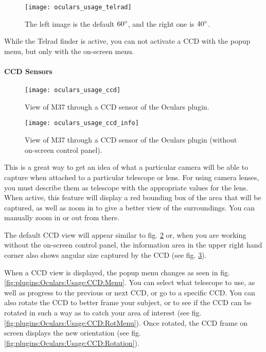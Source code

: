 \begin{figure}[b]\centering
\texttt{[image: oculars\_usage\_telrad]}
\caption{The left image is the default $60\degree$, and the right one is $40\degree$.}
\label{fig:plugins:Oculars:Usage:Telrad}
\end{figure}

While the Telrad finder is active, you can not activate a CCD with the popup menu, but only with the on-screen menu.

\paragraph{CCD Sensors}


\begin{figure}[ht]\centering
\texttt{[image: oculars\_usage\_ccd]}
\caption{View of M37 through a CCD sensor of the Oculars plugin.}
\label{fig:plugins:Oculars:Usage:CCD}
\end{figure}

\begin{figure}[ht]\centering
\texttt{[image: oculars\_usage\_ccd\_info]}
\caption{View of M37 through a CCD sensor of the Oculars plugin (without on-screen control panel).}
\label{fig:plugins:Oculars:Usage:CCD:Info}
\end{figure}

\noindent This is a great way to get an idea of what a particular camera will be able to capture when attached to a particular telescope or lens. 
For using camera lenses, you must describe them as telescope with the appropriate values for the lens. 
When active, this feature will display a red bounding box of the area that will be captured, 
as well as zoom in to give a better view of the surroundings. You can manually zoom in or out from there.

The default CCD view will appear similar to fig. \ref{fig:plugins:Oculars:Usage:CCD} or, 
when you are working without the on-screen control panel, the information area in the upper right hand corner 
also shows angular size captured by the CCD (see fig. \ref{fig:plugins:Oculars:Usage:CCD:Info}).


When a CCD view is displayed, the popup menu changes  as seen in  fig. \ref{fig:plugins:Oculars:Usage:CCD:Menu}. 
You can select what telescope to use, as well as progress to the previous or next CCD, or go to a specific CCD. 
You can also rotate the CCD to better frame your subject, or to see if the CCD can be rotated in such a way as to 
catch your area of interest (see fig. \ref{fig:plugins:Oculars:Usage:CCD:RotMenu}). 
Once rotated, the CCD frame on screen displays the new orientation (see fig. \ref{fig:plugins:Oculars:Usage:CCD:Rotation}).


